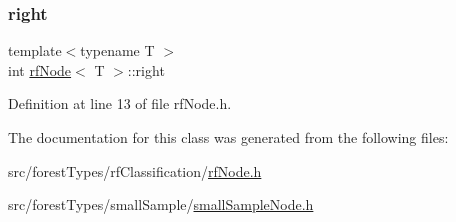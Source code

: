 \subsubsection{\texorpdfstring{right}{right}}
{\footnotesize\ttfamily template$<$typename T $>$ \\
int \hyperlink{classrfNode}{rf\+Node}$<$ T $>$\+::right\hspace{0.3cm}{\ttfamily [protected]}}



Definition at line 13 of file rf\+Node.\+h.



The documentation for this class was generated from the following files\+:\begin{DoxyCompactItemize}
\item 
src/forest\+Types/rf\+Classification/\hyperlink{rfNode_8h}{rf\+Node.\+h}\item 
src/forest\+Types/small\+Sample/\hyperlink{smallSampleNode_8h}{small\+Sample\+Node.\+h}\end{DoxyCompactItemize}
